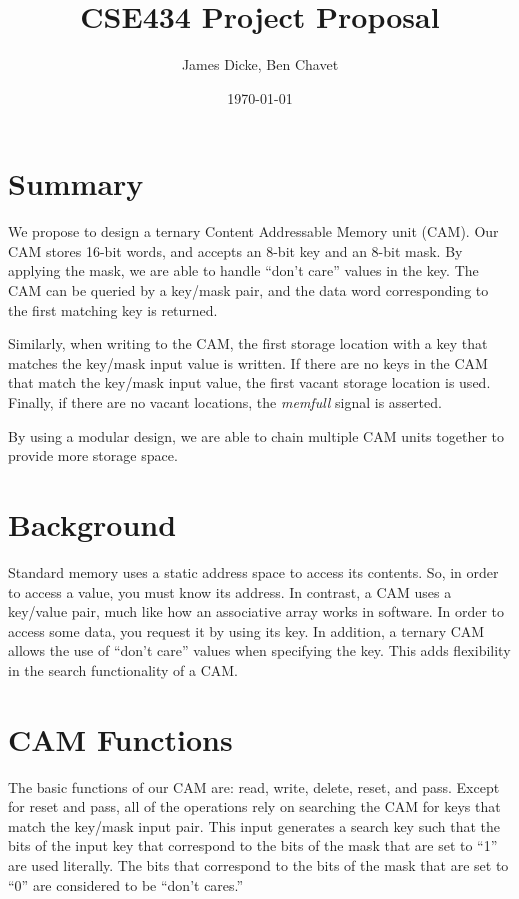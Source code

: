 \documentclass{article}
\title{CSE434 Project Proposal}
\author{James Dicke, Ben Chavet}
\date{\today}
\begin{document}
  \maketitle

  \section{Summary}

  We propose to design a ternary Content Addressable Memory unit (CAM). Our
  CAM stores 16-bit words, and accepts an 8-bit key and an 8-bit mask.
  By applying the mask, we are able to handle ``don't care'' values in the
  key.  The CAM can be queried by a key/mask pair, and the data word
  corresponding to the first matching key is returned.

  Similarly, when writing to the CAM, the first storage location with a key that
  matches the key/mask input value is written.  If there are no keys in the CAM
  that match the key/mask input value, the first vacant storage location is
  used. Finally, if there are no vacant locations, the {\it memfull} signal
  is asserted.

  By using a modular design, we are able to chain multiple CAM units together
  to provide more storage space.

  \section{Background}

  Standard memory uses a static address space to access its contents.  So, in
  order to access a value, you must know its address.  In contrast, a CAM uses a
  key/value pair, much like how an associative array works in software.  In
  order to access some data, you request it by using its key. In addition, a 
  ternary CAM allows the use of ``don't care'' values when specifying the key.
  This adds flexibility in the search functionality of a CAM. \cite{wikipedia}

  \section{CAM Functions}

  The basic functions of our CAM are: read, write, delete, reset, and pass.
  Except for reset and pass, all of the operations rely on searching the
  CAM for keys that match the key/mask input pair.  This input generates a
  search key such that the bits of the input key that correspond to the bits
  of the mask that are set to ``1'' are used literally.  The bits that
  correspond to the bits of the mask that are set to ``0'' are considered to
  be ``don't cares.''
\end{document}
